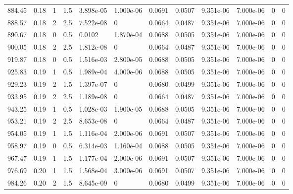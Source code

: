 \documentclass[preview]{standalone}
\begin{document}
{{{\begin{tabular}{L{1.2cm}C{1.2cm} C{0.3cm}C{0.5cm} C{1.4cm}C{1.4cm} C{1.4cm}C{1.4cm} C{1.6cm}C{1.6cm} C{1.6cm}C{1.6cm}}
  884.45  &  0.18  & 1     & 1.5 &  3.898e-05  & 1.000e-06  &  0.0691&   0.0507& 9.351e-06 & 7.000e-06   &  0 & 0  \\ 
  888.57  &  0.18  & 2     & 2.5 &  7.522e-08  & 0  &  0.0664&   0.0487& 9.351e-06 & 7.000e-06   &  0 & 0  \\ 
  890.67  &  0.18  & 0     & 0.5 &  0.0102  & 1.870e-04  &  0.0688&   0.0505& 9.351e-06 & 7.000e-06   &  0 & 0  \\ 
  900.05  &  0.18  & 2     & 2.5 &  1.812e-08  & 0  &  0.0664&   0.0487& 9.351e-06 & 7.000e-06   &  0 & 0  \\ 
  919.87  &  0.18  & 0     & 0.5 &  1.516e-03  & 2.800e-05  &  0.0688&   0.0505& 9.351e-06 & 7.000e-06   &  0 & 0  \\ 
  925.83  &  0.19  & 1     & 0.5 &  1.989e-04  & 4.000e-06  &  0.0688&   0.0505& 9.351e-06 & 7.000e-06   &  0 & 0  \\ 
  929.23  &  0.19  & 2     & 1.5 &  1.397e-07  & 0  &  0.0680&   0.0499& 9.351e-06 & 7.000e-06   &  0 & 0  \\ 
  933.95  &  0.19  & 2     & 2.5 &  1.189e-08  & 0  &  0.0664&   0.0487& 9.351e-06 & 7.000e-06   &  0 & 0  \\ 
  943.25  &  0.19  & 1     & 0.5 &  1.028e-03  & 1.900e-05  &  0.0688&   0.0505& 9.351e-06 & 7.000e-06   &  0 & 0  \\ 
  953.21  &  0.19  & 2     & 2.5 &  8.653e-08  & 0  &  0.0664&   0.0487& 9.351e-06 & 7.000e-06   &  0 & 0  \\ 
  954.05  &  0.19  & 1     & 1.5 &  1.116e-04  & 2.000e-06  &  0.0691&   0.0507& 9.351e-06 & 7.000e-06   &  0 & 0  \\ 
  958.97  &  0.19  & 0     & 0.5 &  6.314e-03  & 1.160e-04  &  0.0688&   0.0505& 9.351e-06 & 7.000e-06   &  0 & 0  \\ 
  967.47  &  0.19  & 1     & 1.5 &  1.177e-04  & 2.000e-06  &  0.0691&   0.0507& 9.351e-06 & 7.000e-06   &  0 & 0  \\ 
  976.69  &  0.20  & 1     & 1.5 &  1.568e-04  & 3.000e-06  &  0.0691&   0.0507& 9.351e-06 & 7.000e-06   &  0 & 0  \\ 
  984.26  &  0.20  & 2     & 1.5 &  8.645e-09  & 0  &  0.0680&   0.0499& 9.351e-06 & 7.000e-06   &  0 & 0  \\ 
\hline 
\end{tabular} 

}}}
\end{document}
